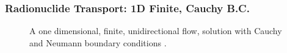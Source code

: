 \begin{frame}
  \frametitle{Radionuclide Transport: 1D Finite, Cauchy B.C.}
\begin{figure}[htbp!]
  \begin{center}
    \def\svgwidth{.5\textwidth}
    
  \end{center}
  \caption{A one dimensional, finite, unidirectional flow,
  solution with Cauchy and Neumann boundary conditions 
\cite{van_genuchten_analytical_1982, brenner_diffusion_1962}.}
  \label{fig:1dinf}
\end{figure}
\end{frame}





